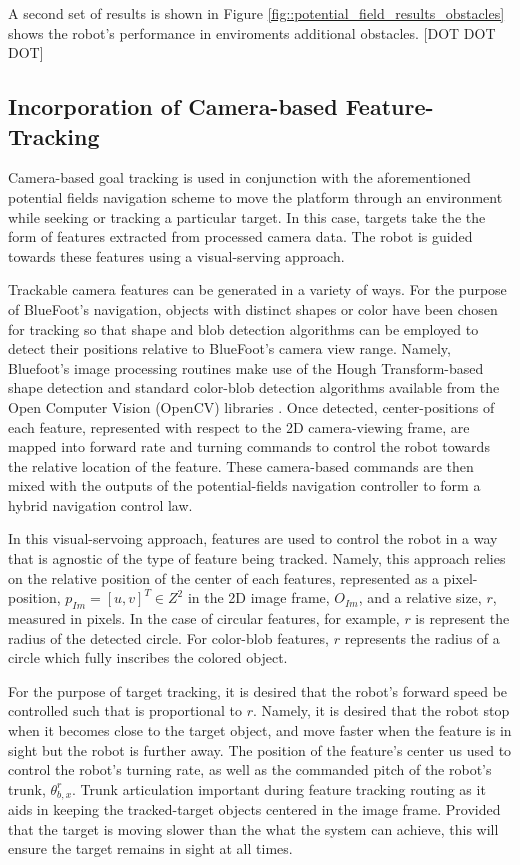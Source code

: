 			A second set of results is shown in Figure \ref{fig::potential_field_results_obstacles} shows the robot's performance in enviroments additional obstacles. [DOT DOT DOT]

		\subsection{Incorporation of Camera-based Feature-Tracking}
		
			Camera-based goal tracking is used in conjunction with the aforementioned potential fields navigation scheme to move the platform through an environment while seeking or tracking a particular target. In this case, targets take the the form of features extracted from processed camera data. The robot is guided towards these features using a visual-serving approach. 

			Trackable camera features can be generated in a variety of ways. For the purpose of BlueFoot's navigation, objects with distinct shapes or color have been chosen for tracking so that shape and blob detection algorithms can be employed to detect their positions relative to BlueFoot's camera view range. Namely, Bluefoot's image processing routines make use of the Hough Transform-based shape detection and standard color-blob detection algorithms available from the Open Computer Vision (OpenCV) libraries \cite{opencv_library}. Once detected, center-positions of each feature, represented with respect to the 2D camera-viewing frame, are mapped into forward rate and turning commands to control the robot towards the relative location of the feature. These camera-based commands are then mixed with the outputs of the potential-fields navigation controller to form a hybrid navigation control law.

			In this visual-servoing approach, features are used to control the robot in a way that is agnostic of the type of feature being tracked. Namely, this approach relies on the relative position of the center of each features, represented as a pixel-position, $p_{Im} = [u,v]^{T} \in Z^{2}$ in the 2D image frame, $O_{Im}$, and a relative size, $r$, measured in pixels. In the case of circular features, for example, $r$ is represent the radius of the detected circle. For color-blob features, $r$ represents the radius of a circle which fully inscribes the colored object.

			For the purpose of target tracking, it is desired that the robot's forward speed be controlled such that is proportional to $r$. Namely, it is desired that the robot stop when it becomes close to the target object, and move faster when the feature is in sight but the robot is further away. The position of the feature's center us used to control the robot's turning rate, as well as the commanded pitch of the robot's trunk, $\theta_{b,x}^{r}$. Trunk articulation important during feature tracking routing as it aids in keeping the tracked-target objects centered in the image frame. Provided that the target is moving slower than the what the system can achieve, this will ensure the target remains in sight at all times.

